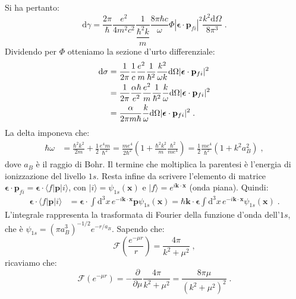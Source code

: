 \documentclass[10pt,a4paper]{report}
\theoremstyle{definition}
\numberwithin{equation}{section}
\newcommand{\diff}[1][]{\mathrm{d}#1}
\newcommand{\bra}{\langle}
\newcommand{\ket}{\rangle}
\begin{document}
Si ha pertanto:
\begin{equation}
\diff{\gamma}=\frac{2\pi}{\hbar}\frac{e^2}{4m^2c^2}\frac{1}{\dfrac{\hbar^2k}{m}}\frac{8\pi\hbar c}{\omega}\Phi|\boldsymbol{\epsilon}\cdot\mathbf{p}_{fi}|^2\frac{k^2\diff{\Omega}}{8\pi^3}\;.
\end{equation}
Dividendo per $\Phi$ otteniamo la sezione d'urto differenziale:
\begin{align}
\diff{\sigma} &= \frac{1}{2\pi}\frac{1}{c}\frac{e^2}{m}\frac{1}{\hbar^2}\frac{k^2}{\omega k}\diff{\Omega}|\boldsymbol{\epsilon}\cdot\mathbf{p}_{fi}|^2 \notag \\
&= \frac{1}{2\pi}\frac{\alpha\hbar}{e^2}\frac{e^2}{m}\frac{1}{\hbar^2}\frac{k}{\omega}\diff{\Omega}|\boldsymbol{\epsilon}\cdot\mathbf{p}_{fi}|^2 \notag \\
&= \frac{\alpha}{2\pi m\hbar}\frac{k}{\omega}\diff{\Omega}|\boldsymbol{\epsilon}\cdot\mathbf{p}_{fi}|^2\;.
\end{align}
La delta imponeva che:
\begin{align}
\hbar\omega &= \frac{\hbar^2k^2}{2m}+\frac{1}{2}\frac{e^4m}{\hbar^2}= \frac{me^4}{2\hbar^2}\left(1+\frac{\hbar^2k^2}{m}\frac{\hbar^2}{me^4}\right)= \frac{1}{2}\frac{me^4}{\hbar^2}(1+k^2a_B^2)\;,
\end{align}
dove $a_B$ è il raggio di Bohr. Il termine che moltiplica la parentesi è l'energia di ionizzazione del livello $1s$. Resta infine da scrivere l'elemento di matrice $\boldsymbol{\epsilon}\cdot\mathbf{p}_{fi}=\boldsymbol{\epsilon}\cdot\bra f|\mathbf{p}|i\ket$, con $|i\ket=\psi_{1s}(\mathbf{x})$ e $|f\ket=e^{i\mathbf{k}\cdot\mathbf{x}}$ (onda piana). Quindi:
\begin{align}
\boldsymbol{\epsilon}\cdot\bra f|\mathbf{p}|i\ket &= \boldsymbol{\epsilon}\cdot \int\diff^3{x}\,e^{-i\mathbf{k}\cdot\mathbf{x}}\mathbf{p}\psi_{1s}(\mathbf{x}) =  \hbar\mathbf{k}\cdot\boldsymbol{\epsilon}\int\diff^3{x}\,e^{-i\mathbf{k}\cdot\mathbf{x}}\psi_{1s}(\mathbf{x})\;.
\end{align}
L'integrale rappresenta la trasformata di Fourier della funzione d'onda dell'$1s$, che è $\psi_{1s}=(\pi a_B^3)^{-1/2}e^{-r/a_B}$. Sapendo che:
\begin{equation}
\mathcal{F}\left(\frac{e^{-\mu r}}{r}\right)=\frac{4\pi}{k^2+\mu^2}\;,
\end{equation}
ricaviamo che:
\begin{equation}
\mathcal{F}(e^{-\mu r})=-\frac{\partial}{\partial\mu}\frac{4\pi}{k^2+\mu^2}=\frac{8\pi\mu}{(k^2+\mu^2)^2}\;.
\end{equation}
\end{document}
